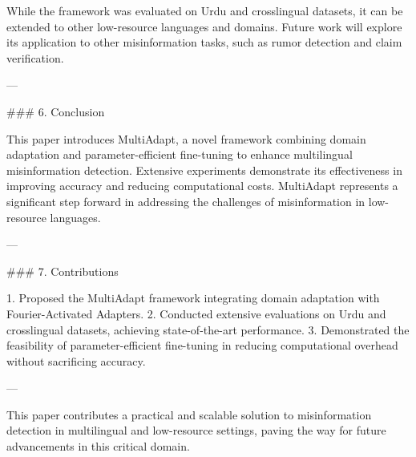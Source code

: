 While the framework was evaluated on Urdu and crosslingual datasets, it can be extended to other low-resource languages and domains. Future work will explore its application to other misinformation tasks, such as rumor detection and claim verification.  

---

### 6. Conclusion  

This paper introduces MultiAdapt, a novel framework combining domain adaptation and parameter-efficient fine-tuning to enhance multilingual misinformation detection. Extensive experiments demonstrate its effectiveness in improving accuracy and reducing computational costs. MultiAdapt represents a significant step forward in addressing the challenges of misinformation in low-resource languages.  

---

### 7. Contributions  

1. Proposed the MultiAdapt framework integrating domain adaptation with Fourier-Activated Adapters.  
2. Conducted extensive evaluations on Urdu and crosslingual datasets, achieving state-of-the-art performance.  
3. Demonstrated the feasibility of parameter-efficient fine-tuning in reducing computational overhead without sacrificing accuracy.  

---  

This paper contributes a practical and scalable solution to misinformation detection in multilingual and low-resource settings, paving the way for future advancements in this critical domain.